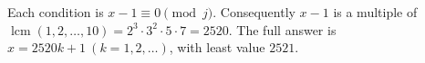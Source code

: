 Each condition is $x-1\equiv 0\pmod j$. Consequently $x-1$ is a multiple of $\operatorname{lcm}(1,2,\ldots,10)=2^3\cdot 3^2\cdot 5\cdot 7=2520$. The full answer is $\boxed{x=2520k+1\ (k=1,2,\ldots)}$, with least value $\boxed{2521}$.
